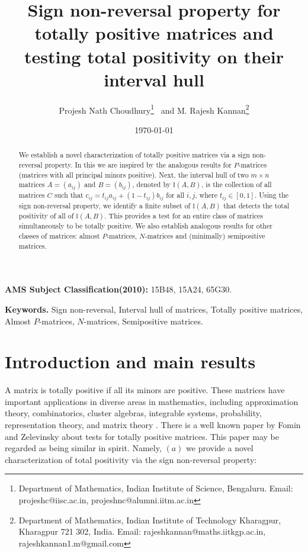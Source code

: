 \documentclass[11pt]{article}
\title{Sign non-reversal property for totally positive matrices and testing total positivity on their interval hull}
\author{Projesh Nath Choudhury\thanks{Department of Mathematics, Indian Institute of  Science, Bengaluru. Email: projeshc@iisc.ac.in, projeshnc@alumni.iitm.ac.in}  ~and M. Rajesh Kannan\thanks{Department of Mathematics, Indian Institute of Technology Kharagpur, Kharagpur 721 302, India. Email: rajeshkannan@maths.iitkgp.ac.in, rajeshkannan1.m@gmail.com }
}
\date{\today}
\begin{document}
    \maketitle
    \begin{abstract}We establish a novel characterization of totally positive matrices via a sign non-reversal property. In this we are inspired by the analogous results for $P$-matrices (matrices with all principal minors positive). Next, the interval hull of two $m \times n$ matrices $A=(a_{ij})$ and $B = (b_{ij})$, denoted by $\mathbb{I}(A,B)$, is the collection of all matrices $C$ such that $c_{ij}=t_{ij}a_{ij}+(1-t_{ij})b_{ij}$ for all $i,j$, where $t_{ij} \in [0,1]$.  Using the sign non-reversal property, we identify a finite subset of  $\mathbb{I}(A,B)$ that detects the total positivity of all of $\mathbb{I}(A,B)$. This provides a test for an entire class of matrices simultaneously to be totally positive. We also establish analogous results for other classes of matrices: almost $P$-matrices, $N$-matrices and (minimally) semipositive matrices.

    \end{abstract}

    {\bf AMS Subject Classification(2010):}    15B48, 15A24, 65G30.

    \textbf{Keywords. }  Sign non-reversal, Interval hull of matrices, Totally positive matrices, Almost $P$-matrices, $N$-matrices, Semipositive matrices.
\section{Introduction and main results}

A matrix is totally positive if all its minors are positive. These
matrices have important applications in diverse areas in mathematics,
including approximation theory, combinatorics, cluster algebras,
integrable systems, probability, representation theory, and matrix theory
\cite{BGKI,BGKII,BFZ96,Bre95,FZ02,K68,Lu94,Sch07}. There is a well known
paper by Fomin and Zelevinsky \cite{FZ00} about tests for totally
positive matrices. This paper may be regarded as being similar in spirit.
Namely, $(a)$ we provide a novel characterization of total positivity via
the sign non-reversal property:
 
\end{document}
